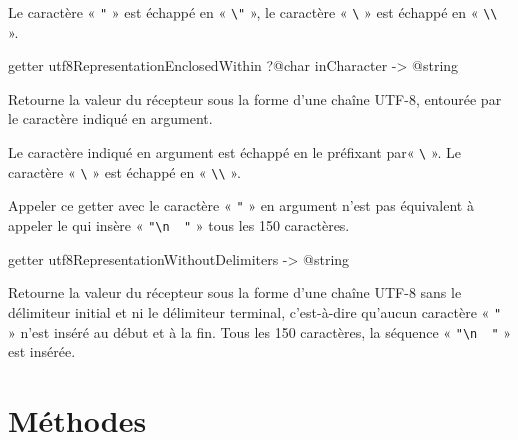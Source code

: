 Le caractère « \texttt{"} » est échappé en « \texttt{\textbackslash"} », le caractère « \texttt{\textbackslash} » est échappé en « \texttt{\textbackslash\textbackslash} ».










\begin{galgasbox}
getter utf8RepresentationEnclosedWithin ?@char inCharacter -> @string
\end{galgasbox}

Retourne la valeur du récepteur sous la forme d'une chaîne UTF-8, entourée par le caractère indiqué en argument.

Le caractère indiqué en argument est échappé en le préfixant par« \texttt{\textbackslash} ». Le caractère « \texttt{\textbackslash} » est échappé en « \texttt{\textbackslash\textbackslash} ».

Appeler ce getter avec le caractère « \texttt{"} » en argument n'est pas équivalent à appeler le  qui insère  « \texttt{"\textbackslash n~~"} » tous les 150 caractères.









\begin{galgasbox}
getter utf8RepresentationWithoutDelimiters -> @string
\end{galgasbox}

Retourne la valeur du récepteur sous la forme d'une chaîne UTF-8 sans le délimiteur initial et ni le délimiteur terminal, c'est-à-dire qu'aucun caractère « \texttt{"} » n'est inséré au début et à la fin. Tous les 150 caractères, la séquence « \texttt{"\textbackslash n~~"} » est insérée.














\section{Méthodes}





